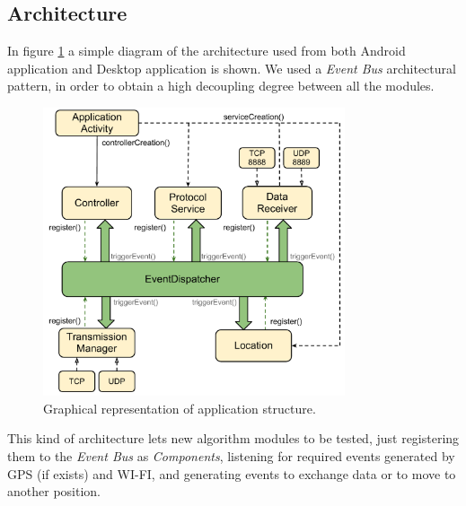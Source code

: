 \subsection{Architecture}

In figure \ref{fig:architecture} a simple diagram of the architecture used from both Android application and Desktop application is shown. We used a \textit{Event Bus} architectural pattern, in order to obtain a high decoupling degree between all the modules.

\begin{figure}[htbp]
	\centering
	\includegraphics[trim = 10mm 0mm 0mm 0mm,width=3.5in]{imgs/components_architecture.pdf}
	\caption{Graphical representation of application structure.}
	\label{fig:architecture}
\end{figure}

This kind of architecture lets new algorithm modules to be tested, just registering them to the \textit{Event Bus} as \textit{Components}, listening for required events generated by GPS (if exists) and WI-FI, and generating events to exchange data or to move to another position.

